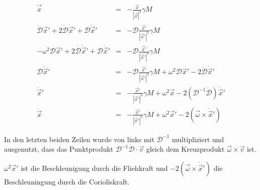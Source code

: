 \documentclass[12pt]{article}
\begin{document}
\begin{eqnarray}
\vec{\ddot{x}} &=& - \frac{\vec{x}}{\left| \vec{x} \right|^3} \gamma M \nonumber \\
\ddot{\mathcal{D}}\vec{x}' + 2 \dot{\mathcal{D}}\dot{\vec{x}}' + \mathcal{D}\ddot{\vec{x}}' &=& - \mathcal{D}\frac{\vec{x}'}{\left| \vec{x}' \right|^3} \gamma M \nonumber \\
-\omega^2\mathcal{D}\vec{x}' + 2 \dot{\mathcal{D}}\dot{\vec{x}}' + \mathcal{D}\ddot{\vec{x}}' &=& - \mathcal{D}\frac{\vec{x}'}{\left| \vec{x}' \right|^3} \gamma M \nonumber \\ 
\mathcal{D}\ddot{\vec{x}}' &=& - \mathcal{D}\frac{\vec{x}'}{\left| \vec{x}' \right|^3} \gamma M + \omega^2\mathcal{D}\vec{x}' - 2 \dot{\mathcal{D}}\dot{\vec{x}}' \nonumber \\
\ddot{\vec{x}}' &=& - \frac{\vec{x}'}{\left| \vec{x}' \right|^3} \gamma M + \omega^2\vec{x} - 2 \left( \mathcal{D}^{-1} \dot{\mathcal{D}}\right)\dot{\vec{x}}' \nonumber \\
\ddot{\vec{x}} &=& - \frac{\vec{x}'}{\left| \vec{x}' \right|^3} \gamma M + \omega^2\vec{x}' - 2 \left( \vec{\omega} \times \dot{\vec{x}}'\right) \label{eq:translated}
\end{eqnarray}

In den letzten beiden Zeilen wurde von links mit $\mathcal{D}^{-1}$ multipliziert und ausgenutzt, dass das Punktprodukt $\mathcal{D}^{-1}\dot{\mathcal{D}} \cdot \vec{v}$ gleich dem Kreuzprodukt $\vec{\omega}\times\vec{v}$ ist.

$\omega^2\vec{x}'$ ist die Beschleunigung durch die Fliehkraft und $- 2 \left( \vec{\omega} \times \dot{\vec{x}}'\right)$ die Beschleuningung durch die Corioliskraft.
\end{document}
